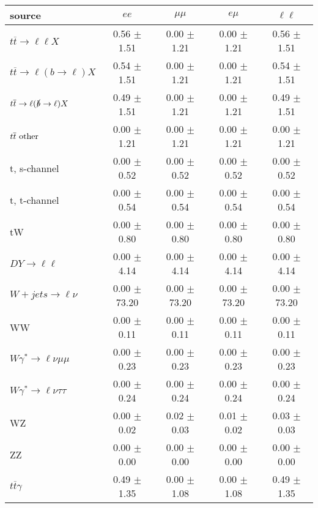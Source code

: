 \begin{tabular}{l|cccc} \hline\hline
source & $ee$ & $\mu\mu$ & $e\mu$ & $\ell\ell $ \\
\hline
$t\overline{t} \rightarrow \ell \ell X$ &  0.56 $\pm$  1.51 &  0.00 $\pm$  1.21 &  0.00 $\pm$  1.21 &  0.56 $\pm$  1.51 \\
$t\overline{t} \rightarrow \ell (b \rightarrow \ell) X$ &  0.54 $\pm$  1.51 &  0.00 $\pm$  1.21 &  0.00 $\pm$  1.21 &  0.54 $\pm$  1.51 \\
$t\overline{t} \rightarrow \ell (\slashed b \rightarrow \ell) X$ &  0.49 $\pm$  1.51 &  0.00 $\pm$  1.21 &  0.00 $\pm$  1.21 &  0.49 $\pm$  1.51 \\
        $t\overline{t}\ \rm{other}$ &  0.00 $\pm$  1.21 &  0.00 $\pm$  1.21 &  0.00 $\pm$  1.21 &  0.00 $\pm$  1.21 \\
\hline
                       t, s-channel &  0.00 $\pm$  0.52 &  0.00 $\pm$  0.52 &  0.00 $\pm$  0.52 &  0.00 $\pm$  0.52 \\
                       t, t-channel &  0.00 $\pm$  0.54 &  0.00 $\pm$  0.54 &  0.00 $\pm$  0.54 &  0.00 $\pm$  0.54 \\
                                 tW &  0.00 $\pm$  0.80 &  0.00 $\pm$  0.80 &  0.00 $\pm$  0.80 &  0.00 $\pm$  0.80 \\
\hline
         $DY \rightarrow \ell \ell$ &  0.00 $\pm$  4.14 &  0.00 $\pm$  4.14 &  0.00 $\pm$  4.14 &  0.00 $\pm$  4.14 \\
      $W+jets \rightarrow \ell \nu$ &  0.00 $\pm$ 73.20 &  0.00 $\pm$ 73.20 &  0.00 $\pm$ 73.20 &  0.00 $\pm$ 73.20 \\
                                 WW &  0.00 $\pm$  0.11 &  0.00 $\pm$  0.11 &  0.00 $\pm$  0.11 &  0.00 $\pm$  0.11 \\
\hline
$W\gamma^{*} \rightarrow \ell \nu \mu\mu$ &  0.00 $\pm$  0.23 &  0.00 $\pm$  0.23 &  0.00 $\pm$  0.23 &  0.00 $\pm$  0.23 \\
$W\gamma^{*} \rightarrow \ell \nu \tau\tau$ &  0.00 $\pm$  0.24 &  0.00 $\pm$  0.24 &  0.00 $\pm$  0.24 &  0.00 $\pm$  0.24 \\
                                 WZ &  0.00 $\pm$  0.02 &  0.02 $\pm$  0.03 &  0.01 $\pm$  0.02 &  0.03 $\pm$  0.03 \\
                                 ZZ &  0.00 $\pm$  0.00 &  0.00 $\pm$  0.00 &  0.00 $\pm$  0.00 &  0.00 $\pm$  0.00 \\
\hline
              $t\overline{t}\gamma$ &  0.49 $\pm$  1.35 &  0.00 $\pm$  1.08 &  0.00 $\pm$  1.08 &  0.49 $\pm$  1.35 \\

\end{tabular}
